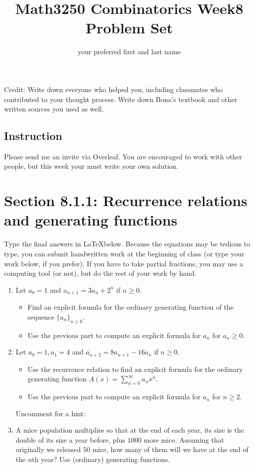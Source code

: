 \documentclass[10pt]{amsart}
\title{Math3250 Combinatorics Week8 Problem Set}
\author{your preferred first and last name}
\date{}
\begin{document}
\maketitle


\noindent Credit: 
Write down everyone who helped you, including classmates who contributed to your thought process. Write down Bona's textbook and other written sources you used as well.

\subsection*{Instruction}
Please send me an invite via Overleaf. 
You are encouraged to work with other people, but this week your must write your own solution.

\bigskip 


\section{Section 8.1.1: Recurrence relations and generating functions}
Type the final answers in \LaTeX below. 
Because the equations may be tedious to type, you can submit handwritten work at the beginning of class (or type your work below, if you prefer). 
If you have to take partial fractions, 
you may use a computing tool (or not), but do the rest of your work by hand. 

\begin{enumerate}
\item 
Let $a_0=1$ and $a_{n+1} = 3 a_n + 2^n$ if $n \geq 0$.
\begin{itemize}
\item Find an explicit formula for the ordinary generating function of the sequence $\{ a_n\}_{n \geq 0}$.
\item Use the previous part to compute an explicit formula for $a_n$ for $a_n \geq 0$.
\end{itemize} 

\item 
Let $a_0=1, a_1=4$ and $a_{n+2} = 8 a_{n+1} - 16 a_n$ if $n \geq 0$.
\begin{itemize}
\item Use the recurrence relation to find an explicit formula for the ordinary generating function 
$A(x)=\sum_{n=0}^\infty a_n x^n$. 
\item Use the previous part to compute an explicit formula for $a_n$ for $n\geq 2$.
\end{itemize} 

\noindent Uncomment for a hint:

\item 
A mice population multiplies so that at the end of each year, its size is the double of its size a year before, plus $1000$ more mice.
Assuming that originally we released $50$ mice, how many of them will we have at the end of the $n$th year?
Use (ordinary) generating functions.
\end{enumerate}
\end{document}
